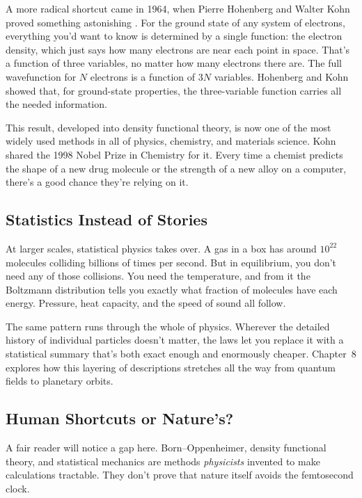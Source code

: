 A more radical shortcut came in 1964, when Pierre Hohenberg and Walter Kohn proved something astonishing \cite{hohenbergkohn1964}. For the ground state of any system of electrons, everything you'd want to know is determined by a single function: the electron density, which just says how many electrons are near each point in space. That's a function of three variables, no matter how many electrons there are. The full wavefunction for \(N\) electrons is a function of \(3N\) variables. Hohenberg and Kohn showed that, for ground-state properties, the three-variable function carries all the needed information.

This result, developed into density functional theory, is now one of the most widely used methods in all of physics, chemistry, and materials science. Kohn shared the 1998 Nobel Prize in Chemistry for it. Every time a chemist predicts the shape of a new drug molecule or the strength of a new alloy on a computer, there's a good chance they're relying on it.

\subsection{Statistics Instead of Stories}

At larger scales, statistical physics takes over. A gas in a box has around \(10^{22}\) molecules colliding billions of times per second. But in equilibrium, you don't need any of those collisions. You need the temperature, and from it the Boltzmann distribution tells you exactly what fraction of molecules have each energy. Pressure, heat capacity, and the speed of sound all follow.

The same pattern runs through the whole of physics. Wherever the detailed history of individual particles doesn't matter, the laws let you replace it with a statistical summary that's both exact enough and enormously cheaper. Chapter~8 explores how this layering of descriptions stretches all the way from quantum fields to planetary orbits.

\subsection{Human Shortcuts or Nature's?}

A fair reader will notice a gap here. Born--Oppenheimer, density functional theory, and statistical mechanics are methods \emph{physicists} invented to make calculations tractable. They don't prove that nature itself avoids the femtosecond clock.

